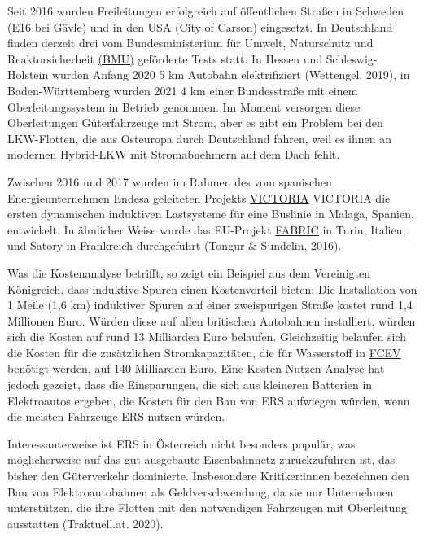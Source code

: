 \documentclass[
]{book}
\begin{document}
Seit 2016 wurden Freileitungen erfolgreich auf öffentlichen Straßen in Schweden (E16 bei Gävle) und in den USA (City of Carson) eingesetzt. In Deutschland finden derzeit drei vom Bundesministerium für Umwelt, Naturschutz und Reaktorsicherheit \href{www.bmu.de}{(BMU)} geförderte Tests statt. In Hessen und Schleswig-Holstein wurden Anfang 2020 5 km Autobahn elektrifiziert (Wettengel, 2019), in Baden-Württemberg wurden 2021 4 km einer Bundesstraße mit einem Oberleitungssystem in Betrieb genommen. Im Moment versorgen diese Oberleitungen Güterfahrzeuge mit Strom, aber es gibt ein Problem bei den LKW-Flotten, die aus Osteuropa durch Deutschland fahren, weil es ihnen an modernen Hybrid-LKW mit Stromabnehmern auf dem Dach fehlt.

Zwischen 2016 und 2017 wurden im Rahmen des vom spanischen Energieunternehmen Endesa geleiteten Projekts \href{https://www.fcirce.es/en/smart-mobility-en-en/victoria-2}{VICTORIA} VICTORIA die ersten dynamischen induktiven Lastsysteme für eine Buslinie in Malaga, Spanien, entwickelt. In ähnlicher Weise wurde das EU-Projekt \href{https://trimis.ec.europa.eu/project/feasibility-analysis-and-development-road-charging-solutions-future-electric-vehicles}{FABRIC} in Turin, Italien, und Satory in Frankreich durchgeführt (Tongur \& Sundelin, 2016).

Was die Kostenanalyse betrifft, so zeigt ein Beispiel aus dem Vereinigten Königreich, dass induktive Spuren einen Kostenvorteil bieten: Die Installation von 1 Meile (1,6 km) induktiver Spuren auf einer zweispurigen Straße kostet rund 1,4 Millionen Euro. Würden diese auf allen britischen Autobahnen installiert, würden sich die Kosten auf rund 13 Milliarden Euro belaufen. Gleichzeitig belaufen sich die Kosten für die zusätzlichen Stromkapazitäten, die für Wasserstoff in \protect\hyperlink{FCEV}{FCEV} benötigt werden, auf 140 Milliarden Euro. Eine Kosten-Nutzen-Analyse hat jedoch gezeigt, dass die Einsparungen, die sich aus kleineren Batterien in Elektroautos ergeben, die Kosten für den Bau von ERS aufwiegen würden, wenn die meisten Fahrzeuge ERS nutzen würden.

Interessanterweise ist ERS in Österreich nicht besonders populär, was möglicherweise auf das gut ausgebaute Eisenbahnnetz zurückzuführen ist, das bisher den Güterverkehr dominierte. Insbesondere Kritiker:innen bezeichnen den Bau von Elektroautobahnen als Geldverschwendung, da sie nur Unternehmen unterstützen, die ihre Flotten mit den notwendigen Fahrzeugen mit Oberleitung ausstatten (Traktuell.at. 2020).
\end{document}

